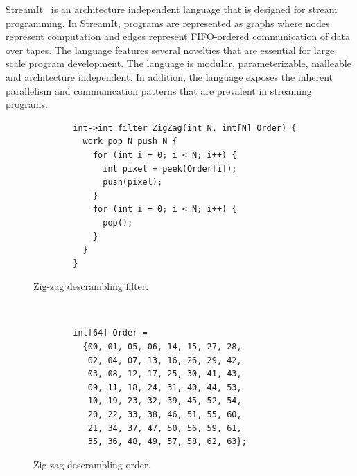\label{sec:streamit}

StreamIt~\cite{streamitcc} is an architecture independent language
that is designed for stream programming. In StreamIt, programs are
represented as graphs where nodes represent computation and edges
represent FIFO-ordered communication of data over tapes. The language
features several novelties that are essential for large scale program
development. The language is modular, parameterizable, malleable and
architecture independent. In addition, the language exposes the
inherent parallelism and communication patterns that are prevalent in
streaming programs.

\begin{figure}[t]
  \begin{minipage}[t]{4.0in}
    {
	\begin{scriptsize}
	  \begin{verbatim}
	    int->int filter ZigZag(int N, int[N] Order) {
	      work pop N push N {
	        for (int i = 0; i < N; i++) {
	          int pixel = peek(Order[i]);
	          push(pixel);
	        }
	        for (int i = 0; i < N; i++) {
	          pop();
	        }
	      }
	    }
	  \end{verbatim}
	\end{scriptsize}
    }
    \vspace{-28pt}
    \caption{Zig-zag descrambling filter.}
    \vspace{-6pt}
    \label{fig:zigzag-filter}
  \end{minipage}
  ~~\vrule~~
  \begin{minipage}[t]{3.0in}
    {
	\begin{scriptsize}
	  \begin{verbatim}
	    int[64] Order =
	      {00, 01, 05, 06, 14, 15, 27, 28,
	       02, 04, 07, 13, 16, 26, 29, 42,
	       03, 08, 12, 17, 25, 30, 41, 43,
	       09, 11, 18, 24, 31, 40, 44, 53,
	       10, 19, 23, 32, 39, 45, 52, 54,
	       20, 22, 33, 38, 46, 51, 55, 60,
	       21, 34, 37, 47, 50, 56, 59, 61,
	       35, 36, 48, 49, 57, 58, 62, 63};
	  \end{verbatim}
	\end{scriptsize}
    }
    \vspace{-12pt}
    \caption{Zig-zag descrambling order.}
    \vspace{-6pt}
    \label{fig:zigzag-order}
  \end{minipage}
\end{figure}

